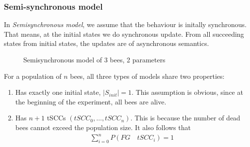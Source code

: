 \documentclass[12pt]{article}
\theoremstyle{definition}
\newcommand*{\oh}{\frac{1}{2}}
\begin{document}
\subsubsection*{Semi-synchronous model}
In \textit{Semisynchronous model}, we assume that the behaviour is initally
synchronous. That means, at the initial states we do synchronous update. From
all succeeding states from initial states, the updates are of asynchronous semantics.
\begin{figure}[H]
  \centering 
  \caption{Semisynchronous model of 3 bees, 2 parameters}
\end{figure}

For a population of $n$ bees, all three types of models share two properties:
\begin{enumerate}
\item Has exactly one initial state, $|S_{init}| = 1$. This assumption is
  obvious, since at the beginning of the experiment, all bees are alive.
\item Has $n+1$ tSCCs $(tSCC_0,\ldots,tSCC_n)$. This is because the number of
  dead bees cannot exceed the population size. It also follows that
  \begin{align*}
    \sum_{i=0}^n P(FG\quad tSCC_i) = 1
  \end{align*}
\end{enumerate}
\end{document}
